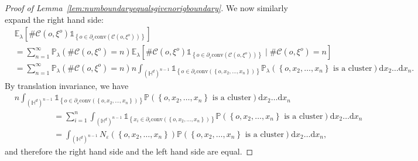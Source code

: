 \documentclass[10pt,a4paper,dvipsnames]{article}
\theoremstyle{definition}
\theoremstyle{remark}
\newcommand{\p}{\mathbb P}
\newcommand{\pla}{\mathbb P_\lambda}
\newcommand{\ela}{\mathbb E_{\lambda}}
\newcommand{\HypDim}{{\mathbb{H}^d}}
\newcommand{\dd}{\mathrm{d}} %
\newcommand{\C}{\mathscr {C}}
\newcommand{\convex}[1]{{\mathrm{conv}\left(#1\right)}}
\newcommand{\Id}{\mathds 1}
\newcommand{\orig}{o}
\numberwithin{equation}{section}
\begin{document}
\begin{proof}[Proof of Lemma~\ref{lem:numboundaryequalsgivenorigboundary}]
    We now similarly expand the right hand side:
    \begin{align}
        &\ela\left[\#\C\left(\orig,\xi^{\orig}\right)\Id_{\left\{\orig\in\partial_\varepsilon\convex{\C\left(\orig,\xi^{\orig}\right)}\right\}}\right]\nonumber\\
        &=\sum_{n=1}^\infty \pla\left(\#\C\left(\orig,\xi^\orig\right)=n\right)\ela\left[\#\C\left(\orig,\xi^{\orig}\right)\Id_{\left\{\orig\in\partial_\varepsilon\convex{\C\left(\orig,\xi^{\orig}\right)}\right\}}\mid \#\C\left(\orig,\xi^\orig\right)=n\right]\nonumber\\
        &=\sum_{n=1}^\infty \pla\left(\#\C\left(\orig,\xi^\orig\right)=n\right)n\int_{\left(\HypDim\right)^{n-1}}\Id_{\left\{\orig\in\partial_{\varepsilon}\convex{\left\{\orig,x_2,\ldots,x_n\right\}}\right\}}\pla\left(\left\{\orig,x_2,\ldots,x_n\right\}\text{ is a cluster}\right)\dd x_2\ldots \dd x_n.
    \end{align}
    By translation invariance, we have
    \begin{align}
        &n\int_{\left(\HypDim\right)^{n-1}}\Id_{\left\{\orig\in\partial_{\varepsilon}\convex{\left\{\orig,x_2,\ldots,x_n\right\}}\right\}}\p\left(\left\{\orig,x_2,\ldots,x_n\right\}\text{ is a cluster}\right)\dd x_2\ldots \dd x_n\nonumber\\
        &\hspace{2cm}= \sum^n_{i=1}\int_{\left(\HypDim\right)^{n-1}}\Id_{\left\{x_i\in\partial_{\varepsilon}\convex{\left\{\orig,x_2,\ldots,x_n\right\}}\right\}}\p\left(\left\{\orig,x_2,\ldots,x_n\right\}\text{ is a cluster}\right)\dd x_2\ldots \dd x_n\nonumber\\
        &\hspace{2cm}= \int_{\left(\HypDim\right)^{n-1}}N_\varepsilon\left(\left\{\orig,x_2,\ldots,x_n\right\}\right)\p\left(\left\{\orig,x_2,\ldots,x_n\right\}\text{ is a cluster}\right)\dd x_2\ldots \dd x_n,
    \end{align}
    and therefore the right hand side and the left hand side are equal.
\end{proof}
\end{document}
